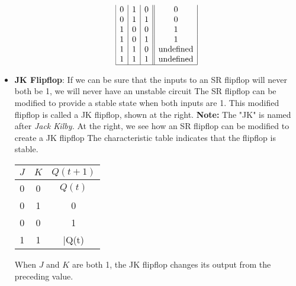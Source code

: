\documentclass{report}
\begin{document}
\begin{itemize}
\[\begin{array}{|c|c|c||c|}
                    0 & 1 & 0 & 0 \\
                    0 & 1 & 1 & 0 \\
                    1 & 0 & 0 & 1 \\
                    1 & 0 & 1 & 1 \\
                    1 & 1 & 0 & \text{undefined} \\
                    1 & 1 & 1 & \text{undefined} \\
                    \hline
                \end{array}
            \]
        \item \textbf{JK Flipflop}: If we can be sure that the inputs to an SR flipflop will never both be 1, we will never have an unstable circuit
            \bigbreak \noindent 
            The SR flipflop can be modified to provide a stable state when both inputs are 1.
            \bigbreak \noindent 
             This modified flipflop is called a JK flipflop, shown at the right.
             \bigbreak \noindent 
             \textbf{Note:} The "JK" is named after \textit{Jack Kilby.}
             \bigbreak \noindent 
             \bigbreak \noindent 
             At the right, we see how an SR flipflop can be modified to create a JK flipflop
             \bigbreak \noindent 
             \bigbreak \noindent 
             The characteristic table indicates that the flipflop is stable.
             \bigbreak \noindent 
             \begin{center}
                 \begin{tabular}{cc|c}
                     $J$&$K$&$Q(t+1)$  \\
                     \hline
                     0 & 0 & $Q(t)$ \\
                     0 & 1 & 0 \\
                     0 & 0  & 1\\
                     1 & 1 & \bar{Q}(t)
                 \end{tabular}
             \end{center}
             \bigbreak \noindent 
             When $J$ and $K$ are both 1, the JK flipflop changes its output from the preceding value.





    \end{itemize}


    \pagebreak 
    \bigbreak \noindent 
\end{document}
